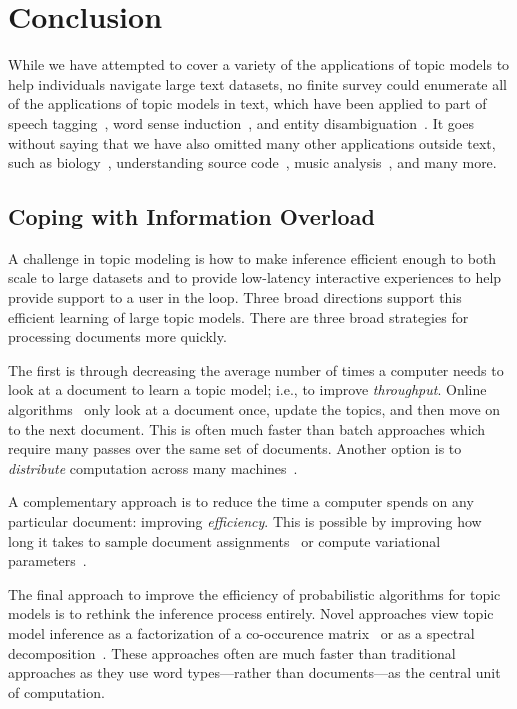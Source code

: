 
\chapter{Conclusion}
\label{ch:conc}

While we have attempted to cover a variety of the applications of
topic models to help individuals navigate large text datasets, no
finite survey could enumerate all of the applications of topic models
in text, which have been applied to part of speech
tagging~\citep{toutanova-08}, word sense induction~\citep{brody-09},
and entity disambiguation~\citep{kataria-11}.  It goes without saying
that we have also omitted many other applications outside text, such
as biology~\cite{pritchard-00}, understanding source
code~\cite{maskeri-08}, music analysis~\cite{hu-09}, and many more.

\section{Coping with Information Overload}
\label{sec:fast-inference}

A challenge in topic modeling is how to make inference efficient
enough to both scale to large datasets and to provide low-latency
interactive experiences to help provide support to a user in the loop.
Three broad directions support this efficient learning of large topic
models.  There are three broad strategies for processing documents
more quickly.


The first is through decreasing the average number of times a computer
needs to look at a document to learn a topic model; i.e., to improve
\emph{throughput}.  Online algorithms~\cite{hoffman-10} only look at a
document once, update the topics, and then move on to the next
document.  This is often much faster than batch approaches which
require many passes over the same set of documents.  Another option is
to \emph{distribute} computation across many machines~\citep{zhai-12}.

A complementary approach is to reduce the time a computer spends on
any particular document: improving \emph{efficiency}.  This is
possible by improving how long it takes to sample document
assignments~\citep{yao-09,li2014reducing} or compute variational
parameters~\citep{mimno-12}.

The final approach to improve the efficiency of probabilistic
algorithms for topic models is to rethink the inference process
entirely.  Novel approaches view topic model inference as a
factorization of a co-occurence matrix~\citep{arora-13} or as a spectral
decomposition~\citep{anandkumar-12}.  These approaches often are much faster than
traditional approaches as they use word types---rather than
documents---as the central unit of computation.

